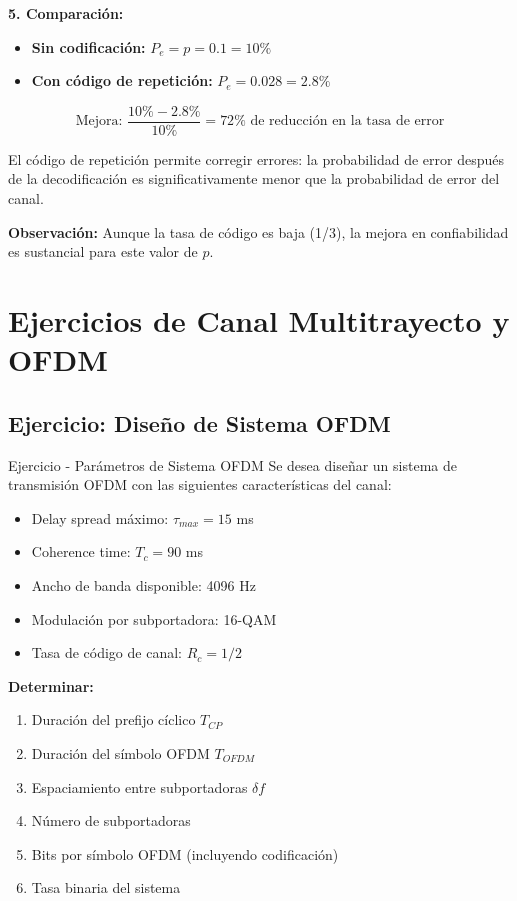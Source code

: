 \documentclass[10pt,a4paper]{article}
\begin{document}
\begin{solucion}
\textbf{5. Comparación:}

\begin{itemize}
\item \textbf{Sin codificación:} $P_e = p = 0.1 = 10\%$
\item \textbf{Con código de repetición:} $P_e = 0.028 = 2.8\%$
\end{itemize}

\[
\boxed{\text{Mejora: } \frac{10\% - 2.8\%}{10\%} = 72\% \text{ de reducción en la tasa de error}}
\]

El código de repetición permite corregir errores: la probabilidad de error después de la decodificación es significativamente menor que la probabilidad de error del canal.

\textbf{Observación:} Aunque la tasa de código es baja (1/3), la mejora en confiabilidad es sustancial para este valor de $p$.
\end{solucion}

\newpage
\section{Ejercicios de Canal Multitrayecto y OFDM}

\subsection{Ejercicio: Diseño de Sistema OFDM}

\begin{ejercicio}{Ejercicio - Parámetros de Sistema OFDM}
Se desea diseñar un sistema de transmisión OFDM con las siguientes características del canal:
\begin{itemize}
\item Delay spread máximo: $\tau_{max} = 15$ ms
\item Coherence time: $T_c = 90$ ms
\item Ancho de banda disponible: 4096 Hz
\item Modulación por subportadora: 16-QAM
\item Tasa de código de canal: $R_c = 1/2$
\end{itemize}

\textbf{Determinar:}
\begin{enumerate}
\item Duración del prefijo cíclico $T_{CP}$
\item Duración del símbolo OFDM $T_{OFDM}$
\item Espaciamiento entre subportadoras $\delta f$
\item Número de subportadoras
\item Bits por símbolo OFDM (incluyendo codificación)
\item Tasa binaria del sistema
\end{enumerate}
\end{ejercicio}
\end{document}

